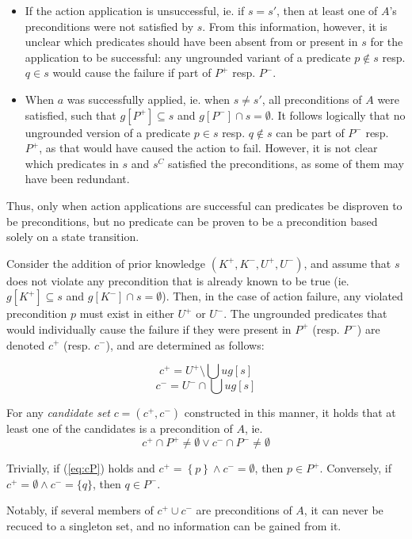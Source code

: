 \documentclass[../master.tex]{subfiles}
\begin{document}
\begin{itemize}
    \item If the action
    application is unsuccessful, ie. if $s=s'$, then at least one of $A$'s
    preconditions were not satisfied by $s$. From this information, however, it
    is unclear which predicates should have been absent from or present in $s$
    for the application to be successful: any ungrounded variant of a predicate
    $p\notin s$ resp. $q\in s$ would cause the failure if part of $P^{+}$ resp.
    $P^{-}$.

    \item When $a$ was successfully applied, ie. when $s\neq s'$, all
    preconditions of $A$ were satisfied, such that $g\left[P^{+}\right]\subseteq
    s$ and $g\left[P^{-}\right]\cap s=\emptyset$. It follows logically that no
    ungrounded version of a predicate $p\in s$ resp. $q\notin s$ can be part of
    $P^{-}$ resp. $P^{+}$, as that would have caused the action to fail.
    However, it is not clear which predicates in $s$ and $s^{C}$ satisfied the
    preconditions, as some of them may have been redundant.
\end{itemize}
Thus,     only when action applications are successful can predicates be
disproven to     be preconditions, but no predicate can be proven to be a
precondition based     solely on a state transition.

Consider the addition of prior knowledge $\left(K^{+},K^{-},U^{+},U^{-}\right)$,
and assume that $s$ does not violate any precondition that is already known to
be true (ie. $g\left[K^{+}\right]\subseteq s$ and $g\left[K^{-}\right]\cap
s=\emptyset$). Then, in the case of action failure, any violated precondition
$p$ must exist in either $U^{+}$ or $U^{-}$. The ungrounded predicates that
would individually cause the failure if they were present in $P^{+}$ (resp.
$P^{-}$) are denoted $c^{+}$ (resp. $c^{-}$), and are determined as follows:

\[ c^{+}=U^{+}\setminus\bigcup ug\left[s\right] \] \[ c^{-}=U^{-}\cap\bigcup
ug\left[s\right] \]

For any \emph{candidate set} $c=\left(c^{+},c^{-}\right)$ constructed in this
manner, it holds that at least one of the candidates is a precondition of $A$,
ie. \begin{equation} c^{+}\cap P^{+}\neq\emptyset\lor c^{-}\cap
P^{-}\neq\emptyset\label{eq:cP} \end{equation}

\begin{cor} \label{candThe}Trivially, if (\ref{eq:cP}) holds and $c^{+}=\left\{
p\right\} \land c^{-}=\emptyset$, then $p\in P^{+}$. Conversely, if
$c^{+}=\emptyset\land c^{-}=\{q\}$, then $q\in P^{-}$. \end{cor} Notably, if
several members of $c^{+}\cup c^{-}$ are preconditions of $A$, it can never be
recuced to a singleton set, and no information can be gained from it.
\end{document}
